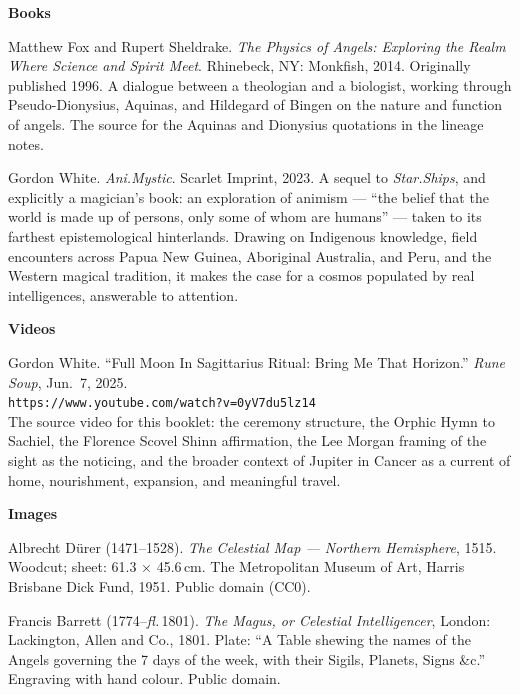 \documentclass[10pt,openany]{book}
\begin{document}
{\footnotesize\color{darkgrey}
\sloppy

\noindent\textbf{Books}

\vspace{6pt}
\noindent Matthew Fox and Rupert Sheldrake. \textit{The Physics of Angels: Exploring the
Realm Where Science and Spirit Meet}. Rhinebeck, NY: Monkfish, 2014. Originally published
1996. A dialogue between a theologian and a biologist, working through Pseudo-Dionysius,
Aquinas, and Hildegard of Bingen on the nature and function of angels. The source for the
Aquinas and Dionysius quotations in the lineage notes.

\vspace{6pt}
\noindent Gordon White. \textit{Ani.Mystic}. Scarlet Imprint, 2023. A sequel to
\textit{Star.Ships}, and explicitly a magician's book: an exploration of animism --- ``the
belief that the world is made up of persons, only some of whom are humans'' --- taken to its
farthest epistemological hinterlands. Drawing on Indigenous knowledge, field encounters
across Papua New Guinea, Aboriginal Australia, and Peru, and the Western magical tradition,
it makes the case for a cosmos populated by real intelligences, answerable to attention.

\vspace{10pt}
\noindent\textbf{Videos}

\vspace{6pt}
\noindent Gordon White. ``Full Moon In Sagittarius Ritual: Bring Me That Horizon.''
\textit{Rune Soup}, Jun.\ 7, 2025.\\
\texttt{https://www.youtube.com/watch?v=0yV7du5lz14}\\
The source video for this booklet: the ceremony structure, the Orphic Hymn
to Sachiel, the Florence Scovel Shinn affirmation, the Lee Morgan framing
of the sight as the noticing, and the broader context of Jupiter in Cancer
as a current of home, nourishment, expansion, and meaningful travel.

\vspace{10pt}
\noindent\textbf{Images}

\vspace{8pt}
\noindent Albrecht D\"urer (1471--1528). \textit{The Celestial Map --- Northern
Hemisphere}, 1515. Woodcut; sheet: 61.3 $\times$ 45.6\,cm.
The Metropolitan Museum of Art, Harris Brisbane Dick Fund, 1951.
Public domain (CC0).

\vspace{6pt}
\noindent Francis Barrett (1774--\textit{fl.}\,1801). \textit{The Magus, or
Celestial Intelligencer}, London: Lackington, Allen and Co., 1801. Plate:
``A Table shewing the names of the Angels governing the 7 days of the week,
with their Sigils, Planets, Signs \&c.'' Engraving with hand colour. Public domain.

}
\end{document}

